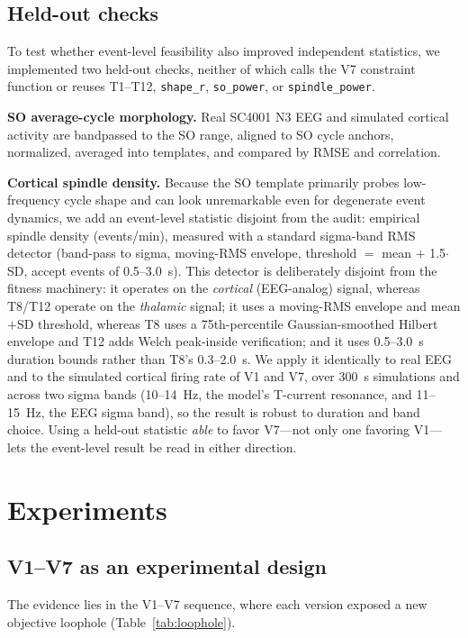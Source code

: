 \documentclass[conference]{IEEEtran}
\newcommand{\code}[1]{\texttt{#1}}
\begin{document}
\subsection{Held-out checks}\label{sec:heldout}
To test whether event-level feasibility also improved independent statistics,
we implemented two held-out checks, neither of which calls the V7 constraint
function or reuses T1--T12, \code{shape\_r}, \code{so\_power}, or
\code{spindle\_power}.

\textbf{SO average-cycle morphology.} Real SC4001 N3 EEG and simulated cortical
activity are bandpassed to the SO range, aligned to SO cycle anchors,
normalized, averaged into templates, and compared by RMSE and correlation.

\textbf{Cortical spindle density.} Because the SO template primarily probes
low-frequency cycle shape and can look unremarkable even for degenerate event
dynamics, we add an event-level statistic disjoint from the audit: empirical
spindle density (events/min), measured with a standard sigma-band RMS detector
(band-pass to sigma, moving-RMS envelope, threshold $=$ mean $+$ 1.5$\cdot$SD,
accept events of 0.5--3.0~s). This detector is deliberately disjoint from the
fitness machinery: it operates on the \emph{cortical} (EEG-analog) signal,
whereas T8/T12 operate on the \emph{thalamic} signal; it uses a moving-RMS
envelope and mean$+$SD threshold, whereas T8 uses a 75th-percentile
Gaussian-smoothed Hilbert envelope and T12 adds Welch peak-inside verification;
and it uses 0.5--3.0~s duration bounds rather than T8's 0.3--2.0~s. We apply it
identically to real EEG and to the simulated cortical firing rate of V1 and V7,
over 300~s simulations and across two sigma bands (10--14~Hz, the model's
T-current resonance, and 11--15~Hz, the EEG sigma band), so the result is
robust to duration and band choice. Using a held-out statistic \emph{able} to
favor V7---not only one favoring V1---lets the event-level result be read in
either direction.

\section{Experiments}
\subsection{V1--V7 as an experimental design}
The evidence lies in the V1--V7 sequence, where each version exposed a new
objective loophole (Table~\ref{tab:loophole}).
\end{document}
